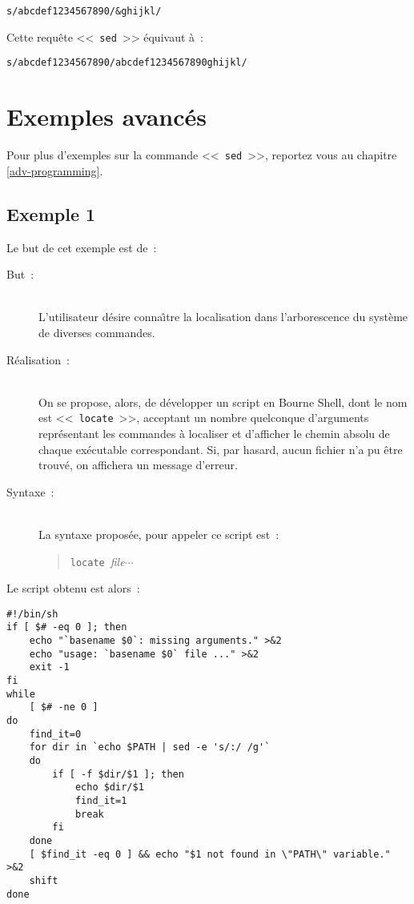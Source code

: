 \begin{example}
\begin{verbatim}
s/abcdef1234567890/&ghijkl/
\end{verbatim}

Cette requ{\^e}te <<~{\tt sed}~>> {\'e}quivaut {\`a}~:
\begin{verbatim}
s/abcdef1234567890/abcdef1234567890ghijkl/
\end{verbatim}
\end{example}

\section{Exemples avanc{\'e}s}

Pour plus d'exemples sur la commande <<~{\tt sed}~>>, reportez vous au chapitre \ref{adv-programming}.


\subsection{\label{adv-fltrs-sed-ex1}Exemple 1}

Le but de cet exemple est de~:
\begin{description}
	\item[But~:]\mbox{}\\
		L'utilisateur d{\'e}sire conna{\^\i}tre la localisation dans l'arborescence du
		syst{\`e}me de diverses commandes.\\[2ex]
	\item[R{\'e}alisation~:]\mbox{}\\
		On se propose, alors, de d{\'e}velopper un script en Bourne Shell, dont le nom est
		<<~{\tt locate}~>>, acceptant un nombre quelconque d'arguments
		repr{\'e}sentant les commandes {\`a} localiser et d'afficher le chemin absolu de
		chaque ex{\'e}cutable correspondant. Si, par hasard, aucun fichier n'a pu {\^e}tre
		trouv{\'e}, on affichera un message d'erreur.\\[2ex]
	\item[Syntaxe~:]\mbox{}\\
		La syntaxe propos{\'e}e, pour appeler ce script est~:
		\begin{quote}
		{\tt locate}~{\sl file}$\cdots$
		\end{quote}
\end{description}

Le script obtenu est alors~:
\begin{verbatim}
#!/bin/sh
if [ $# -eq 0 ]; then
    echo "`basename $0`: missing arguments." >&2
    echo "usage: `basename $0` file ..." >&2
    exit -1
fi
while
    [ $# -ne 0 ]
do
    find_it=0
    for dir in `echo $PATH | sed -e 's/:/ /g'`
    do
        if [ -f $dir/$1 ]; then
            echo $dir/$1
            find_it=1
            break
        fi
    done
    [ $find_it -eq 0 ] && echo "$1 not found in \"PATH\" variable." >&2
    shift
done
\end{verbatim}

